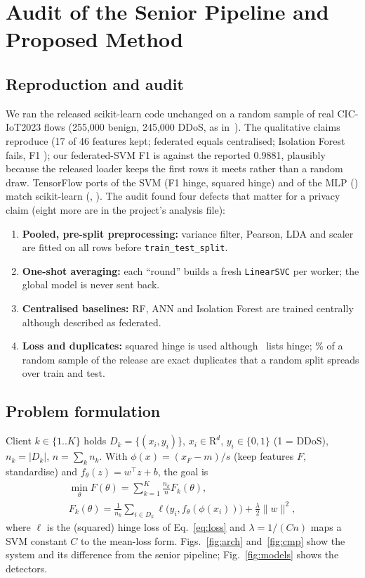 \section{Audit of the Senior Pipeline and Proposed Method}\label{sec:method}
\subsection{Reproduction and audit}\label{sec:audit}
We ran the released scikit-learn code unchanged on a random sample of real CIC-IoT2023 flows (255{,}000 benign, 245{,}000 DDoS, as in~\cite{senior2026}). The qualitative claims reproduce (17 of 46 features kept; federated equals centralised; Isolation Forest fails, F1 ); our federated-SVM F1 is  against the reported 0.9881, plausibly because the released loader keeps the first rows it meets rather than a random draw. TensorFlow ports of the SVM (F1  hinge,  squared hinge) and of the MLP () match scikit-learn (, ). The audit found four defects that matter for a privacy claim (eight more are in the project's analysis file):
\begin{enumerate}
\item \textbf{Pooled, pre-split preprocessing:} variance filter, Pearson, LDA and scaler are fitted on all rows before \texttt{train\_test\_split}.
\item \textbf{One-shot averaging:} each ``round'' builds a fresh \texttt{LinearSVC} per worker; the global model is never sent back.
\item \textbf{Centralised baselines:} RF, ANN and Isolation Forest are trained centrally although described as federated.
\item \textbf{Loss and duplicates:} squared hinge is used although~\cite{senior2026} lists hinge; \% of a random sample of the release are exact duplicates that a random split spreads over train and test.
\end{enumerate}

\subsection{Problem formulation}
Client $k\in\{1..K\}$ holds $D_k=\{(x_i,y_i)\}$, $x_i\in\mathrm{R}^d$, $y_i\in\{0,1\}$ (1 = DDoS), $n_k=|D_k|$, $n=\sum_k n_k$. With $\phi(x)=(x_F-m)/s$ (keep features $F$, standardise) and $f_\theta(z)=w^\top z+b$, the goal is
\begin{equation}\label{eq:obj}
\begin{gathered}
\min_\theta F(\theta)=\sum_{k=1}^{K}\frac{n_k}{n}F_k(\theta),\\
F_k(\theta)=\frac1{n_k}\sum_{i\in D_k}\ell\big(y_i,f_\theta(\phi(x_i))\big)+\frac{\lambda}{2}\lVert w\rVert^2 ,
\end{gathered}
\end{equation}
where $\ell$ is the (squared) hinge loss of Eq.~\eqref{eq:loss} and $\lambda=1/(Cn)$ maps a SVM constant $C$ to the mean-loss form. Figs.~\ref{fig:arch} and~\ref{fig:cmp} show the system and its difference from the senior pipeline; Fig.~\ref{fig:models} shows the detectors.

